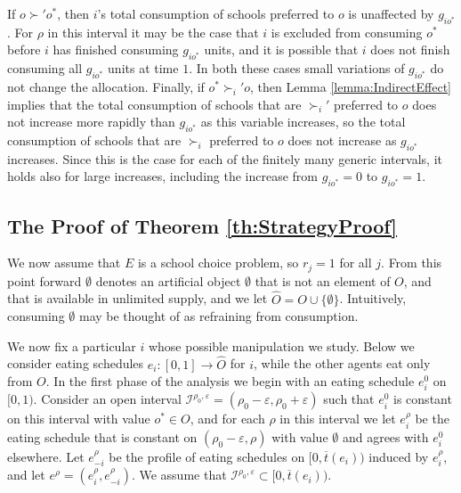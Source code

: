 \documentclass[12pt, A4paper]{article}
\theoremstyle{definition}
\newcommand{\cI}{\mathcal{I}}
\newcommand{\hO}{{\hat O}}
\newcommand{\bart}{{\overline t}}
\newcommand{\varep}{\varepsilon}
\begin{document}
\begin{appendix}
If $o \succ' o^*$, then $i$'s total consumption of schools preferred to $o$ is unaffected by $g_{io^*}$.  For $\rho$ in this interval it may be the case that $i$ is excluded from consuming $o^*$ before $i$ has finished consuming $g_{io^*}$ units, and it is possible that $i$ does not finish consuming all $g_{io^*}$ units at time $1$.  In both these cases small variations of $g_{io^*}$ do not change the allocation. Finally, if $o^* \succ_i' o$, then Lemma \ref{lemma:IndirectEffect} implies that the total consumption of schools that are $\succ_i'$ preferred to $o$ does not increase more rapidly than $g_{io^*}$ as this variable increases, so  the total consumption of schools that are $\succ_i$ preferred to $o$ does not increase as $g_{io^*}$ increases.  Since this is the case for each of the finitely many generic intervals, it holds also for large increases, including the increase from $g_{io^*} = 0$ to $g_{io^*} = 1$.

\subsection{The Proof of Theorem \ref{th:StrategyProof}} \label{app:StrategyProof}

We now assume that $E$ is a school choice problem, so $r_j = 1$ for all $j$.  From this point forward $\emptyset$ denotes an artificial object $\emptyset$ that is not an element of $O$, and that is available in unlimited supply, and we let $\hO = O \cup \{\emptyset\}$.  Intuitively, consuming $\emptyset$ may be thought of as refraining from consumption.

We now fix a particular $i$ whose possible manipulation we study.
Below we consider eating schedules $e_i \colon [0,1] \to \hO$ for $i$, while the other agents eat only from $O$.  In the first phase of the analysis we begin with an eating schedule $e_i^0$ on $[0,1)$.  Consider an open interval $\cI^{\rho_0,\varep} = (\rho_0 - \varep,\rho_0 + \varep)$ such that $e_i^0$ is constant on this interval with value $o^* \in O$, and for each $\rho$ in this interval we let $e_i^\rho$ be the eating schedule that is constant on $(\rho_0 - \varep,\rho)$ with value $\emptyset$ and agrees with $e_i^0$ elsewhere.  Let  $e^\rho_{-i}$ be the profile of eating schedules on $[0,\bart(e_i))$ induced by $e_i^\rho$, and let $e^\rho = (e_i^\rho,e_{-i}^\rho)$.  We assume that $\cI^{\rho_0,\varep} \subset [0,\bart(e_i))$.


\end{appendix}
\end{document}
